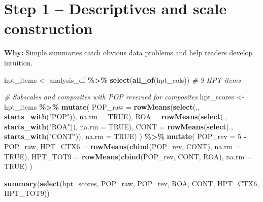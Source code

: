 \documentclass[
  10pt,
]{article}
\newenvironment{Shaded}{\begin{snugshade}}{\end{snugshade}}
\newcommand{\AttributeTok}[1]{\textcolor[rgb]{0.13,0.29,0.53}{#1}}
\newcommand{\CommentTok}[1]{\textcolor[rgb]{0.56,0.35,0.01}{\textit{#1}}}
\newcommand{\ConstantTok}[1]{\textcolor[rgb]{0.56,0.35,0.01}{#1}}
\newcommand{\DecValTok}[1]{\textcolor[rgb]{0.00,0.00,0.81}{#1}}
\newcommand{\FunctionTok}[1]{\textcolor[rgb]{0.13,0.29,0.53}{\textbf{#1}}}
\newcommand{\NormalTok}[1]{#1}
\newcommand{\OtherTok}[1]{\textcolor[rgb]{0.56,0.35,0.01}{#1}}
\newcommand{\SpecialCharTok}[1]{\textcolor[rgb]{0.81,0.36,0.00}{\textbf{#1}}}
\newcommand{\StringTok}[1]{\textcolor[rgb]{0.31,0.60,0.02}{#1}}
\begin{document}
\hypertarget{step-1-descriptives-and-scale-construction}{%
\section{Step 1 -- Descriptives and scale
construction}\label{step-1-descriptives-and-scale-construction}}

\textbf{Why:} Simple summaries catch obvious data problems and help
readers develop intuition.

\begin{Shaded}
\begin{Highlighting}[]
\NormalTok{hpt\_items }\OtherTok{\textless{}{-}}\NormalTok{ analysis\_df }\SpecialCharTok{\%\textgreater{}\%} \FunctionTok{select}\NormalTok{(}\FunctionTok{all\_of}\NormalTok{(hpt\_cols))  }\CommentTok{\# 9 HPT items}

\CommentTok{\# Subscales and composites with POP reversed for composites}
\NormalTok{hpt\_scores }\OtherTok{\textless{}{-}}\NormalTok{ hpt\_items }\SpecialCharTok{\%\textgreater{}\%}
  \FunctionTok{mutate}\NormalTok{(}
    \AttributeTok{POP\_raw =} \FunctionTok{rowMeans}\NormalTok{(}\FunctionTok{select}\NormalTok{(., }\FunctionTok{starts\_with}\NormalTok{(}\StringTok{"POP"}\NormalTok{)),  }\AttributeTok{na.rm =} \ConstantTok{TRUE}\NormalTok{),}
    \AttributeTok{ROA     =} \FunctionTok{rowMeans}\NormalTok{(}\FunctionTok{select}\NormalTok{(., }\FunctionTok{starts\_with}\NormalTok{(}\StringTok{"ROA"}\NormalTok{)),  }\AttributeTok{na.rm =} \ConstantTok{TRUE}\NormalTok{),}
    \AttributeTok{CONT    =} \FunctionTok{rowMeans}\NormalTok{(}\FunctionTok{select}\NormalTok{(., }\FunctionTok{starts\_with}\NormalTok{(}\StringTok{"CONT"}\NormalTok{)), }\AttributeTok{na.rm =} \ConstantTok{TRUE}\NormalTok{)}
\NormalTok{  ) }\SpecialCharTok{\%\textgreater{}\%}
  \FunctionTok{mutate}\NormalTok{(}
    \AttributeTok{POP\_rev   =} \DecValTok{5} \SpecialCharTok{{-}}\NormalTok{ POP\_raw,}
    \AttributeTok{HPT\_CTX6  =} \FunctionTok{rowMeans}\NormalTok{(}\FunctionTok{cbind}\NormalTok{(POP\_rev, CONT), }\AttributeTok{na.rm =} \ConstantTok{TRUE}\NormalTok{),}
    \AttributeTok{HPT\_TOT9  =} \FunctionTok{rowMeans}\NormalTok{(}\FunctionTok{cbind}\NormalTok{(POP\_rev, CONT, ROA), }\AttributeTok{na.rm =} \ConstantTok{TRUE}\NormalTok{)}
\NormalTok{  )}

\FunctionTok{summary}\NormalTok{(}\FunctionTok{select}\NormalTok{(hpt\_scores, POP\_raw, POP\_rev, ROA, CONT, HPT\_CTX6, HPT\_TOT9))}
\end{Highlighting}
\end{Shaded}
\end{document}
